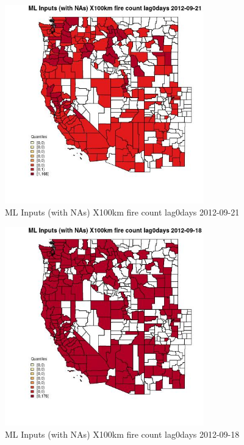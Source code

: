 \begin{figure} 
\centering  
\includegraphics[width=0.77\textwidth]{Code_Outputs/Report_ML_input_PM25_Step4_part_e_de_duplicated_aves_compiled_2019-05-14wNAs_CountyX100km_fire_count_lag0daysMean2012-09-21_2012-09-21.jpg} 
\caption{\label{fig:Report_ML_input_PM25_Step4_part_e_de_duplicated_aves_compiled_2019-05-14wNAsCountyX100km_fire_count_lag0daysMean2012-09-21_2012-09-21}ML Inputs (with NAs) X100km fire count lag0days 2012-09-21} 
\end{figure} 
 

\begin{figure} 
\centering  
\includegraphics[width=0.77\textwidth]{Code_Outputs/Report_ML_input_PM25_Step4_part_e_de_duplicated_aves_compiled_2019-05-14wNAs_CountyX100km_fire_count_lag0daysMean2012-09-18_2012-09-18.jpg} 
\caption{\label{fig:Report_ML_input_PM25_Step4_part_e_de_duplicated_aves_compiled_2019-05-14wNAsCountyX100km_fire_count_lag0daysMean2012-09-18_2012-09-18}ML Inputs (with NAs) X100km fire count lag0days 2012-09-18} 
\end{figure} 
 


